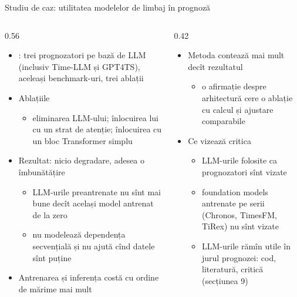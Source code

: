 \begin{frame}{Studiu de caz: utilitatea modelelor de limbaj în prognoză}
\itemsize{\small}
\begin{columns}[T]
\begin{column}{0.56\textwidth}
\begin{itemize}
    \item {}: trei prognozatori pe bază de LLM (inclusiv Time-LLM și GPT4TS), aceleași benchmark-uri, trei ablații
    \item Ablațiile
    \begin{itemize}
        \item eliminarea LLM-ului; înlocuirea lui cu un strat de atenție; înlocuirea cu un bloc Transformer simplu
    \end{itemize}
    \item Rezultat: nicio degradare, adesea o îmbunătățire
    \begin{itemize}
        \item LLM-urile preantrenate nu sînt mai bune decît același model antrenat de la zero
        \item nu modelează dependența secvențială și nu ajută cînd datele sînt puține
    \end{itemize}
    \item Antrenarea și inferența costă cu ordine de mărime mai mult
\end{itemize}
\end{column}
\begin{column}{0.42\textwidth}
\begin{itemize}
    \item Metoda contează mai mult decît rezultatul
    \begin{itemize}
        \item o afirmație despre arhitectură cere o ablație cu calcul și ajustare comparabile
    \end{itemize}
    \item Ce vizează critica
    \begin{itemize}
        \item LLM-urile folosite ca prognozatori sînt vizate
        \item foundation models antrenate pe serii (Chronos, TimesFM, TiRex) nu sînt vizate
        \item LLM-urile rămîn utile în jurul prognozei: cod, literatură, critică (secțiunea 9)
    \end{itemize}
\end{itemize}
\end{column}
\end{columns}
\end{frame}

